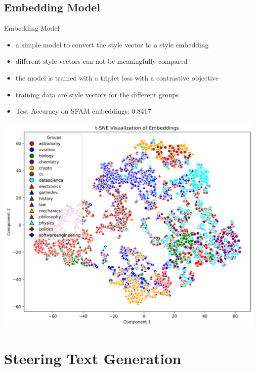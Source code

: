 \documentclass[]{beamer}
\begin{document}
\subsection{Embedding Model}
\begin{frame}{Embedding Model}
  \begin{itemize}
    \item a simple model to convert the style vector to a style embedding
    \item different style vectors can not be meaningfully compared
    \item the model is trained with a triplet loss with a contrastive objective
    \item training data are style vectors for the different groups
    \item Test Accuracy on SFAM embeddings: \num{0.8417}
  \end{itemize}
\end{frame}

\begin{frame}[plain]
  \includegraphics[width=\linewidth]{img/t-SNE-embedding.png}
\end{frame}


\section{Steering Text Generation}
\end{document}
